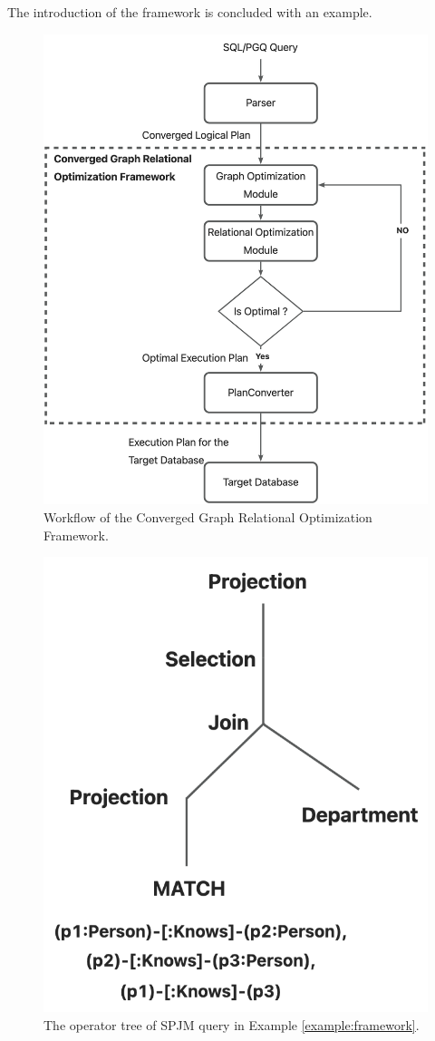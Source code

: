 {The introduction of the framework is concluded with an example.


\begin{figure}
    \centering
    \includegraphics[width=.8\linewidth]{./figures/workflow.png}
    \caption{Workflow of the Converged Graph Relational Optimization Framework.}
    \label{fig:workflow}
\end{figure}

\begin{figure}
    \centering
    \includegraphics[width=.6\linewidth]{./figures/example_tree.png}
    \caption{The operator tree of SPJM query in Example \ref{example:framework}.}
    \label{fig:example-operator-tree}
\end{figure}

}
